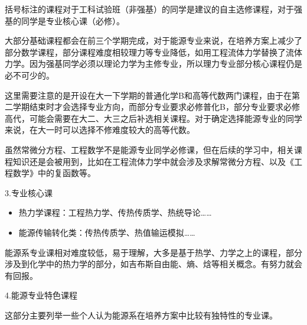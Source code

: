 \documentclass[11pt,oneside]{book}
\begin{document}
括号标注的课程对于工科试验班（非强基）的同学是建议的自主选修课程，对于强基的同学是专业核心课（必修）。

\vspace{10pt}

大部分基础课程都会在前三个学期完成，对于能源专业来说，在培养方案上减少了部分数学课程，部分课程难度相较理力等专业降低，如用工程流体力学替换了流体力学。因为强基同学必须以理论力学为主修专业，所以理力专业部分核心课程仍是必不可少的。

\vspace{10pt}

这里需要注意的是开设在大一下学期的普通化学B和高等代数两门课程，由于在第二学期结束时才会选择专业方向，而部分专业要求必修普化B，部分专业要求必修高代，可能会需要在大二、大三之后补选相关课程。对于确定选择能源专业的同学来说，在大一时可以选择不修难度较大的高等代数。

\vspace{10pt}

虽然常微分方程、工程数学不是能源专业同学必修课，但在后续的学习中，相关课程知识还是会被用到，比如在工程流体力学中就会涉及求解常微分方程、以及《工程数学》中的复函数等。

\vspace{10pt}

3.专业核心课
\begin{itemize}
	\item 热力学课程：工程热力学、传热传质学、热统导论……
	
	\item 能源传输转化类：传热传质学、热值输运模拟……
	
\end{itemize}


能源系专业课相对难度较低，易于理解，大多是基于热学、力学之上的课程，部分涉及到化学中的热力学的部分，如吉布斯自由能、熵、焓等相关概念。有努力就会有回报。

\vspace{10pt}

4.能源专业特色课程

这部分主要列举一些个人认为能源系在培养方案中比较有独特性的专业课。
\end{document}
